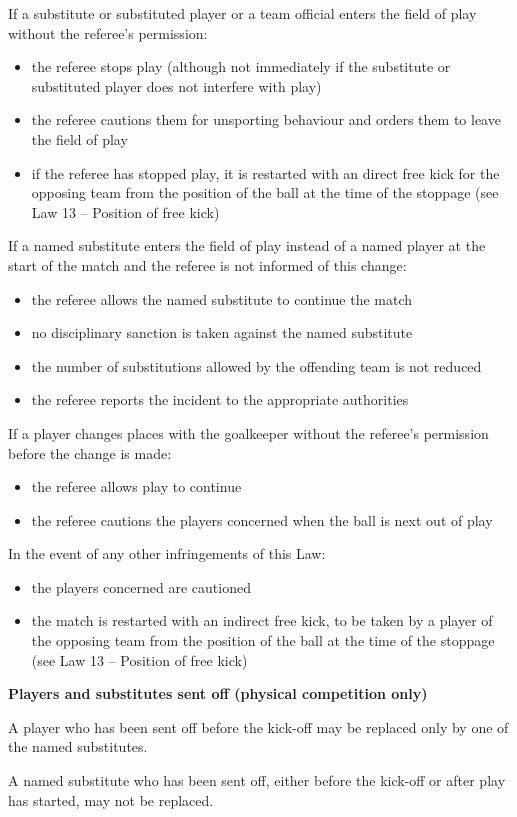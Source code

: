 If a substitute or substituted player or a team official enters the field of play
without the referee's permission:

\begin{itemize}
\item the referee stops play (although not immediately if the substitute or substituted player does not interfere with play)
\item the referee cautions them for unsporting behaviour and orders them to leave the field of play
\item if the referee has stopped play, it is restarted with an direct free kick
      for the opposing team from the position of the ball at the time of the
      stoppage (see Law 13 -- Position of free kick)
\end{itemize}

\bigskip

If a named substitute enters the field of play instead of a named player at the start of the match and the referee is not informed of this change:

\begin{itemize}
\item the referee allows the named substitute to continue the match
\item no disciplinary sanction is taken against the named substitute
\item the number of substitutions allowed by the offending team is not reduced
\item the referee reports the incident to the appropriate authorities
\end{itemize}

\bigskip

If a player changes places with the goalkeeper without the
referee's permission before the change is made:

\begin{itemize}
\item the referee allows play to continue
\item the referee cautions the players concerned when the ball is next out of play
\end{itemize}

\bigskip

In the event of any other infringements of this Law:

\begin{itemize}
\item the players concerned are cautioned
\item the match is restarted with an indirect free kick, to be taken by a player of the opposing team from the position of the ball at the time of the stoppage (see Law 13 -- Position of free kick)
\end{itemize}

\bigskip

{\bfseries Players and substitutes sent off (physical competition only)}

\headlinebox

A player who has been sent off before the kick-off may be replaced only by one of the named substitutes.

\bigskip

A named substitute who has been sent off, either before the kick-off or after play has started, may not be replaced.
